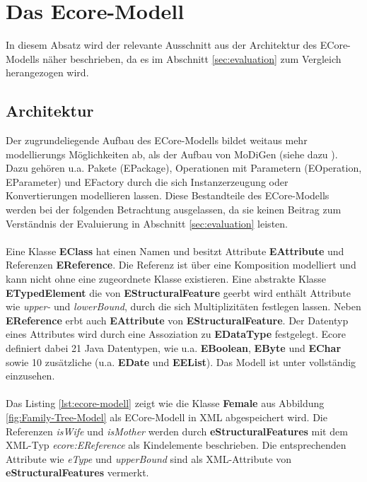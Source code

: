 \section{Das Ecore-Modell}
In diesem Absatz wird der relevante Ausschnitt aus der Architektur des ECore-Modells n\"aher beschrieben, da es im Abschnitt \ref{sec:evaluation} zum Vergleich herangezogen wird.

\subsection{Architektur}
Der zugrundeliegende Aufbau des ECore-Modells bildet weitaus mehr modellierungs Möglichkeiten ab, als der Aufbau von MoDiGen (siehe dazu \cite{eclipse_ecore}). Dazu gehören u.a. Pakete (EPackage), Operationen mit Parametern (EOperation, EParameter) und EFactory durch die sich Instanzerzeugung oder Konvertierungen modellieren lassen. Diese Bestandteile des ECore-Modells werden bei der folgenden Betrachtung ausgelassen, da sie keinen Beitrag zum Verständnis der Evaluierung in Abschnitt \ref{sec:evaluation} leisten.\\
\\
Eine Klasse \textbf{EClass} hat einen Namen und besitzt Attribute \textbf{EAttribute} und Referenzen \textbf{EReference}. Die Referenz ist über eine Komposition modelliert und kann nicht ohne eine zugeordnete Klasse existieren. Eine abstrakte Klasse \textbf{ETypedElement} die von \textbf{EStructuralFeature} geerbt wird enth\"alt Attribute wie \textit{upper-} und \textit{lowerBound}, durch die sich Multiplizitäten festlegen lassen. Neben \textbf{EReference} erbt auch \textbf{EAttribute} von \textbf{EStructuralFeature}. Der Datentyp eines Attributes wird durch eine Assoziation zu \textbf{EDataType} festgelegt. Ecore definiert dabei 21 Java Datentypen, wie u.a. \textbf{EBoolean}, \textbf{EByte} und \textbf{EChar} sowie 10 zus\"atzliche (u.a. \textbf{EDate} und \textbf{EEList}). Das Modell ist unter \cite{eclipse_core} vollst\"andig einzusehen.\\
\\
Das Listing \ref{lst:ecore-modell} zeigt wie die Klasse \textbf{Female} aus Abbildung \ref{fig:Family-Tree-Model} als ECore-Modell in XML abgespeichert wird. Die Referenzen \textit{isWife} und \textit{isMother} werden durch \textbf{eStructuralFeatures} mit dem XML-Typ \textit{ecore:EReference} als Kindelemente beschrieben. Die entsprechenden Attribute wie \textit{eType} und \textit{upperBound} sind als XML-Attribute von \textbf{eStructuralFeatures} vermerkt.


